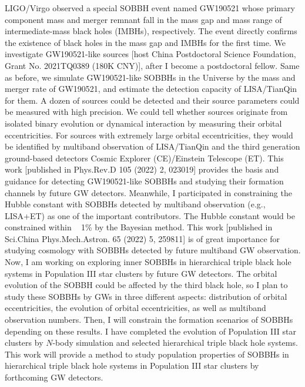 \documentclass[12pt,a4paper,sans]{article}%
\begin{document}
LIGO/Virgo observed a special SOBBH event named
GW190521 whose primary component mass and merger remnant fall in the mass gap and mass range of intermediate-mass black holes (IMBHs), respectively. The event directly confirms the existence of
black holes in the mass gap and IMBHs for the first time. We investigate GW190521-like sources [host China Postdoctoral Science Foundation, Grant No. 2021TQ0389 (180K CNY)], after I become a postdoctoral fellow. Same as before, we simulate GW190521-like SOBBHs in the
Universe by the mass and merger rate of GW190521, and estimate the detection capacity of LISA/TianQin for them. A dozen of sources could be detected and their source
parameters could be measured with high precision. We could tell whether sources originate from isolated binary evolution or dynamical interaction by measuring their orbital eccentricities. For sources with extremely large orbital
eccentricities, they would be identified by multiband observation of LISA/TianQin and the third generation ground-based detectors Cosmic Explorer (CE)/Einstein
Telescope (ET). This work [published in Phys.Rev.D 105 (2022) 2, 023019] provides
the basis and guidance for detecting GW190521-like SOBBHs and studying their formation channels by future GW detectors. Meanwhile, I participated in constraining the Hubble
constant with SOBBHs detected by multiband observation (e.g., LISA+ET) as one of the important
contributors. The Hubble constant would be constrained within ~ 1\% by the Bayesian method. This work [published in Sci.China Phys.Mech.Astron. 65 (2022) 5, 259811] is of great
importance for studying cosmology with SOBBHs detected by future multiband GW observation. Now, I am working on
exploring inner SOBBHs in hierarchical triple black hole systems in Population III star clusters by future GW detectors. The orbital evolution of the SOBBH could be affected by the third black hole, so I plan to
study these SOBBHs by GWs in three different aspects: distribution of orbital
eccentricities, the evolution of orbital eccentricities, as well as multiband observation numbers. Then, I will constrain the formation scenarios of SOBBHs depending on these results. I have completed the evolution of
Population III star clusters by $N$-body simulation and selected hierarchical triple black hole systems. This work will provide a method 
to study population properties of SOBBHs in hierarchical triple black hole systems in Population III star clusters by forthcoming GW detectors.
\end{document}
